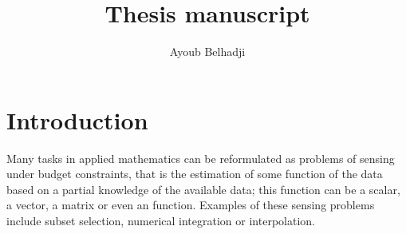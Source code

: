 \documentclass[twoside,11pt]{book}
\numberwithin{theorem}{chapter}
\numberwithin{definition}{chapter}
\numberwithin{proposition}{chapter}
\numberwithin{corollary}{chapter}
\numberwithin{example}{chapter}
\numberwithin{lemma}{chapter}
\numberwithin{assumption}{chapter}
\begin{document}
\title{Thesis manuscript}


\author{Ayoub Belhadji} %
 
\maketitle






\newpage
\chapter{Introduction}\label{chap:introduction}


Many tasks in applied mathematics can be reformulated as problems of sensing under budget constraints, that is the estimation of some function of the data based on a partial knowledge of the available data; this function can be a scalar, a vector, a matrix or even an function. Examples of these sensing problems include subset selection, numerical integration or interpolation. 
\end{document}
